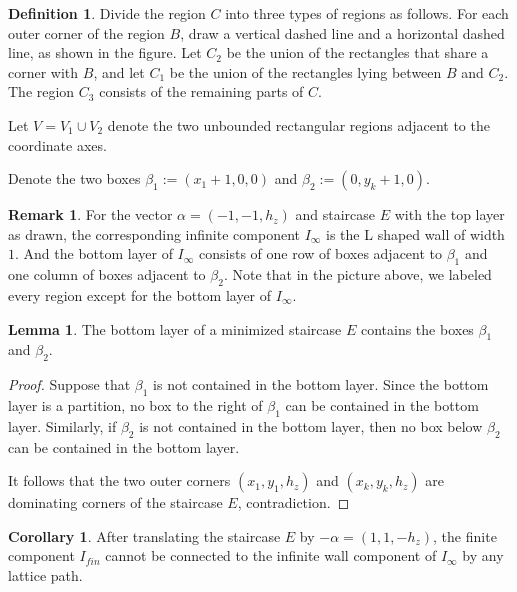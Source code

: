 \documentclass{amsart}[10pt]
\theoremstyle{plain}
\theoremstyle{definition}
\newtheorem{corollary}[theorem]{Corollary}
\newtheorem{lemma}[theorem]{Lemma}
\newtheorem{remark}[theorem]{Remark}
\newtheorem{definition}[theorem]{Definition}
\begin{document}
\begin{definition}
Divide the region $C$ into three types of regions as follows. For each outer
corner of the region $B$, draw a vertical dashed line and a horizontal dashed
line, as shown in the figure. Let $C_2$ be the union of the rectangles that
share a corner with $B$, and let $C_1$ be the union of the rectangles
lying between $B$ and $C_2$. The region $C_3$ consists of the remaining parts of $C$.

Let $V=V_1\cup V_2$ denote the two unbounded rectangular regions
adjacent to the coordinate axes.

Denote the two boxes $\beta_1:=(x_1+1, 0, 0)$ and $\beta_2:=(0,y_k+1,0)$. 

\end{definition}

\begin{remark}
For the vector $\alpha=(-1,-1,h_z)$ and staircase $E$ with the top layer as drawn, the corresponding infinite component $I_\infty$ is the L shaped wall of width $1$. And the bottom layer of $I_\infty$ consists of one row of boxes adjacent to $\beta_1$ and one column of boxes adjacent to $\beta_2$. Note that in the picture above, we labeled every region except for the bottom layer of $I_\infty$.
\end{remark}

\begin{lemma}
\label{V1V2}
The bottom layer of a minimized staircase $E$ contains the boxes $\beta_1$ and $\beta_2$. 
\end{lemma}
\begin{proof}
Suppose that $\beta_1$ is not contained in the bottom layer. Since the bottom layer is a partition, no box to the right
of $\beta_1$ can be contained in the bottom layer. Similarly, if $\beta_2$ is not contained in the bottom layer,
then no box below $\beta_2$ can be contained in the bottom layer.

It follows that the two outer corners $(x_1,y_1,h_z)$ and
$(x_k,y_k,h_z)$ are dominating corners of the staircase $E$, contradiction.
\end{proof}


\begin{corollary}
\label{beta12}
After translating the staircase $E$ by $-\alpha=(1,1, -h_z)$, the finite component $I_{fin}$ cannot be connected to the infinite wall component of $I_\infty$ by any lattice path.
\end{corollary}
\end{document}
